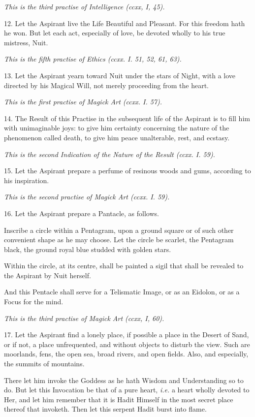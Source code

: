 \textit{This is the third practise of Intelligence (ccxx, I, 45).}

12. Let the Aspirant live the Life Beautiful and Pleasant. For this freedom hath he won. But let each act, especially of love, be devoted wholly to his true mistress, Nuit.

\textit{This is the fifth practise of Ethics (ccxx. I. 51, 52, 61, 63).}

13. Let the Aspirant yearn toward Nuit under the stars of Night, with a love directed by his Magical Will, not merely proceeding from the heart.

\textit{This is the first practise of Magick Art (ccxx. I. 57).}

14. The Result of this Practise in the subsequent life of the Aspirant is to fill him with unimaginable joys: to give him certainty concerning the nature of the phenomenon called death, to give him peace unalterable, rest, and ecstasy.

\textit{This is the second Indication of the Nature of the Result (ccxx. I. 59).}

15. Let the Aspirant prepare a perfume of resinous woods and gums, according to his inspiration.

\textit{This is the second practise of Magick Art (ccxx. I. 59).}

16. Let the Aspirant prepare a Pantacle, as follows.

Inscribe a circle within a Pentagram, upon a ground square or of such other convenient shape as he may choose. Let the circle be scarlet, the Pentagram black, the ground royal blue studded with golden stars.

Within the circle, at its centre, shall be painted a sigil that shall be revealed to the Aspirant by Nuit herself.

And this Pentacle shall serve for a Telismatic Image, or as an Eidolon, or as a Focus for the mind.

\textit{This is the third practise of Magick Art (ccxx, I, 60).}

17. Let the Aspirant find a lonely place, if possible a place in the Desert of Sand, or if not, a place unfrequented, and without objects to disturb the view. Such are moorlands, fens, the open sea, broad rivers, and open fields. Also, and especially, the summits of mountains.

There let him invoke the Goddess as he hath Wisdom and Understanding so to do. But let this Invocation be that of a pure heart, \textit{i.e.} a heart wholly devoted to Her, and let him remember that it is Hadit Himself in the most secret place thereof that invoketh. Then let this serpent Hadit burst into flame.

